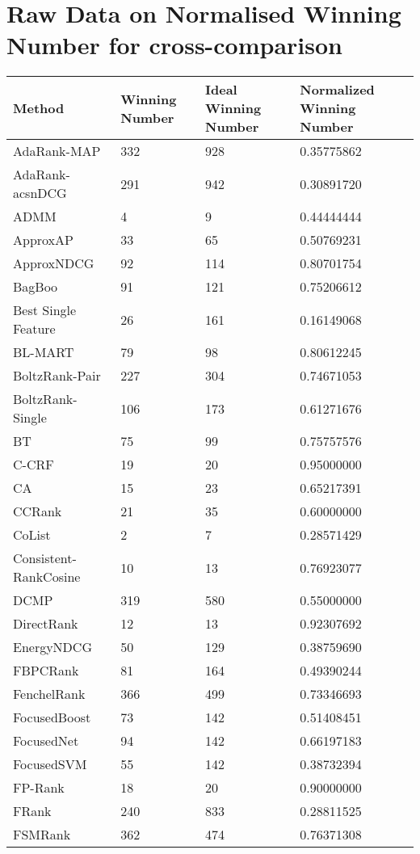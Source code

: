 \chapter{Raw Data on Normalised Winning Number for cross-comparison}
\label{app:norm_winnum_all}

\begin{table}
\begin{tabular}{l|l|l|l}
Method & Winning Number & Ideal Winning Number & Normalized Winning Number \\
\hline
AdaRank-\acs{MAP} & 332 & 928 & 0.35775862 \\ 
AdaRank-acs{nDCG} & 291 & 942 & 0.30891720 \\ 
ADMM & 4 & 9 & 0.44444444 \\ 
ApproxAP & 33 & 65 & 0.50769231 \\ 
ApproxNDCG & 92 & 114 & 0.80701754 \\ 
BagBoo & 91 & 121 & 0.75206612 \\ 
Best Single Feature & 26 & 161 & 0.16149068 \\ 
BL-MART & 79 & 98 & 0.80612245 \\ 
BoltzRank-Pair & 227 & 304 & 0.74671053 \\ 
BoltzRank-Single & 106 & 173 & 0.61271676 \\ 
BT & 75 & 99 & 0.75757576 \\ 
C-CRF & 19 & 20 & 0.95000000 \\ 
CA & 15 & 23 & 0.65217391 \\ 
CCRank & 21 & 35 & 0.60000000 \\ 
CoList & 2 & 7 & 0.28571429 \\ 
Consistent-RankCosine & 10 & 13 & 0.76923077 \\ 
DCMP & 319 & 580 & 0.55000000 \\ 
DirectRank & 12 & 13 & 0.92307692 \\ 
EnergyNDCG & 50 & 129 & 0.38759690 \\ 
FBPCRank & 81 & 164 & 0.49390244 \\ 
FenchelRank & 366 & 499 & 0.73346693 \\ 
FocusedBoost & 73 & 142 & 0.51408451 \\ 
FocusedNet & 94 & 142 & 0.66197183 \\ 
FocusedSVM & 55 & 142 & 0.38732394 \\ 
FP-Rank & 18 & 20 & 0.90000000 \\ 
FRank & 240 & 833 & 0.28811525 \\ 
FSMRank & 362 & 474 & 0.76371308 \\ 

\end{tabular}
\end{table}
